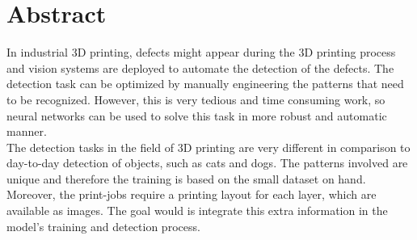 \section*{Abstract}
In industrial 3D printing, defects might appear during the 3D printing process and vision systems are deployed to automate the detection of the defects. The detection task can be optimized by manually engineering the patterns that need to be recognized. However, this is very tedious and time consuming work, so neural networks can be used to solve this task in more robust and automatic manner. \\
The detection tasks in the field of 3D printing are very different in comparison to day-to-day detection of objects, such as cats and dogs. The patterns involved are unique and therefore the training is based on the small dataset on hand. \\
Moreover, the print-jobs require a printing layout for each layer, which are available as images. The goal would is integrate this extra information in the model's training and detection process. \\

\cleardoublepage{}
